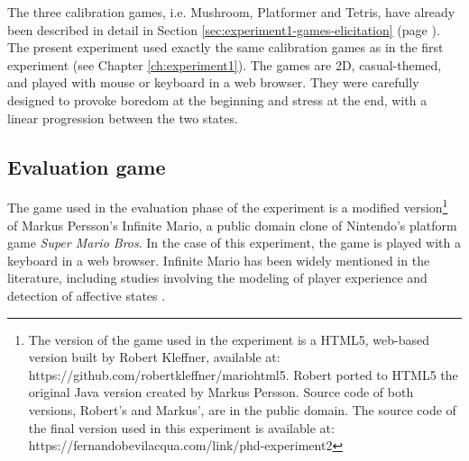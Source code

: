 The three calibration games, i.e. Mushroom, Platformer and Tetris, have already been described in detail in Section \ref{sec:experiment1-games-elicitation} (page \pageref{sec:experiment1-games-elicitation}). The present experiment used exactly the same calibration games as in the first experiment (see Chapter \ref{ch:experiment1}). The games are 2D, casual-themed, and played with mouse or keyboard in a web browser. They were carefully designed to provoke boredom at the beginning and stress at the end, with a linear progression between the two states.

\subsection{Evaluation game}
\label{sec:experiment2-evaluation-game}





The game used in the evaluation phase of the experiment is a modified version\footnote{The version of the game used in the experiment is a HTML5, web-based version built by Robert Kleffner, available at: https://github.com/robertkleffner/mariohtml5. Robert ported to HTML5 the original Java version created by Markus Persson. Source code of both versions, Robert's and Markus', are in the public domain. The source code of the final version used in this experiment is available at: https://fernandobevilacqua.com/link/phd-experiment2} of Markus Persson's Infinite Mario, a public domain clone of Nintendo's platform game \textit{Super Mario Bros}. In the case of this experiment, the game is played with a keyboard in a web browser. Infinite Mario has been widely mentioned in the literature, including studies involving the modeling of player experience \parencite{pedersen2009modeling,pedersen2010modeling,shaker2011game} and detection of affective states \parencite{shaker2011feature}.

